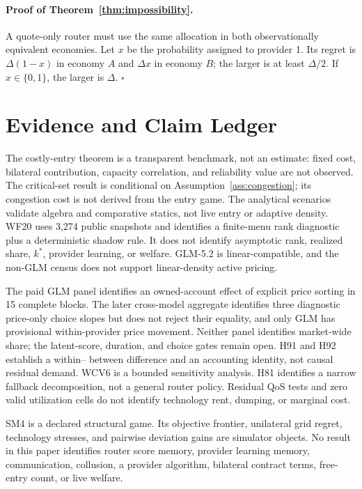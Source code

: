 \documentclass[sigconf,nonacm]{acmart}
\newcommand{\1}{\mathbf 1}
\begin{document}
\paragraph{Proof of Theorem~\ref{thm:impossibility}.}
A quote-only router must use the same allocation in both observationally
equivalent economies.  Let $x$ be the probability assigned to provider 1.  Its
regret is $\Delta(1-x)$ in economy $A$ and $\Delta x$ in economy $B$; the larger
is at least $\Delta/2$.  If $x\in\{0,1\}$, the larger is $\Delta$.
\hfill$\square$

\section{Evidence and Claim Ledger}

The costly-entry theorem is a transparent benchmark, not an estimate: fixed
cost, bilateral contribution, capacity correlation, and reliability value are
not observed.  The critical-set result is conditional on
Assumption~\ref{ass:congestion}; its congestion cost is not derived from the
entry game.  The analytical scenarios validate algebra and comparative statics,
not live entry or adaptive density.  WF20 uses 3,274 public snapshots and
identifies a finite-menu rank diagnostic plus a deterministic shadow rule.  It
does not identify asymptotic rank, realized share, $k^*$, provider learning, or
welfare.  GLM-5.2 is linear-compatible, and the non-GLM census does not support
linear-density active pricing.

The paid GLM panel identifies an owned-account effect of explicit price sorting
in 15 complete blocks.  The later cross-model aggregate identifies three
diagnostic price-only choice slopes but does not reject their equality, and only
GLM has provisional within-provider price movement.  Neither panel identifies
market-wide share; the latent-score, duration, and choice gates remain open.
H91 and H92 establish a within--
between difference and an accounting identity, not causal residual demand.
WCV6 is a bounded sensitivity analysis.  H81 identifies a narrow fallback
decomposition, not a general router policy.  Residual QoS tests and zero valid
utilization cells do not identify technology rent, dumping, or marginal cost.

SM4 is a declared structural game.  Its objective frontier, unilateral grid
regret, technology stresses, and pairwise deviation gains are simulator objects.
No result in this paper identifies router score memory, provider learning memory,
communication, collusion, a provider algorithm, bilateral contract terms,
free-entry count, or live welfare.
\end{document}
